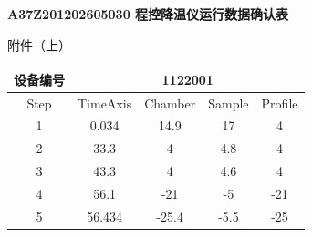 \documentclass[UTF8,10pt,a4paper,fontset=fandol]{ctexart}
\newcommand{\fieldvalue}[1]{#1}
\newcommand{\handwritten}[1]{#1}
\begin{document}
\begin{center}
\textbf{A37Z201202605030 程控降温仪运行数据确认表}
\end{center}

\handwritten{附件（上）}

\small

\begin{center}
\begin{tabular}{|c|c|c|c|c|}
\hline
\multicolumn{1}{|c|}{设备编号} &
\multicolumn{4}{c|}{
\fieldvalue{1122001}}\\
\hline
Step & TimeAxis & Chamber & Sample & Profile\\
\hline
1 &
\fieldvalue{0.034} &
\fieldvalue{14.9} &
\fieldvalue{17} &
\fieldvalue{4}\\
\hline
2 &
\fieldvalue{33.3} &
\fieldvalue{4} &
\fieldvalue{4.8} &
\fieldvalue{4}\\
\hline
3 &
\fieldvalue{43.3} &
\fieldvalue{4} &
\fieldvalue{4.6} &
\fieldvalue{4}\\
\hline
4 &
\fieldvalue{56.1} &
\fieldvalue{-21} &
\fieldvalue{-5} &
\fieldvalue{-21}\\
\hline
5 &
\fieldvalue{56.434} &
\fieldvalue{-25.4} &
\fieldvalue{-5.5} &
\fieldvalue{-25}\\

\end{tabular}
\end{center}
\end{document}
